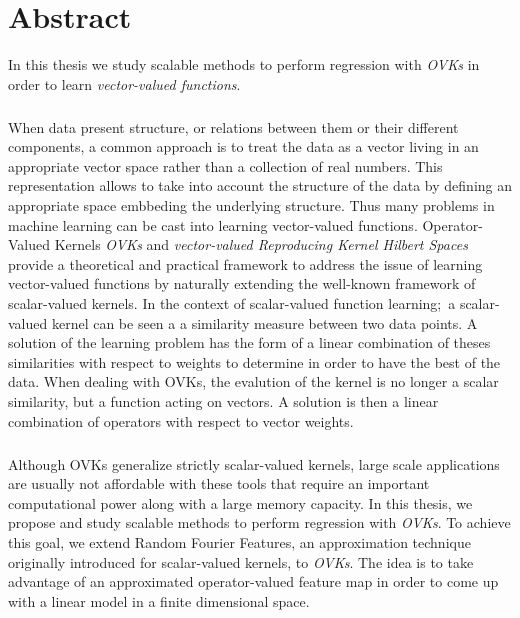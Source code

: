 



\begingroup
\let\clearpage\relax
\let\cleardoublepage\relax
\let\cleardoublepage\relax

\chapter*{Abstract}
In this thesis we study scalable methods to perform regression with
\emph{\acl{OVK}s} in order to learn \emph{vector-valued functions}.
\paragraph{}
When data present structure, or relations between them or their different
components, a common approach is to treat the data as a vector living in an
appropriate vector space rather than a collection of real numbers. This
representation allows to take into account the structure of the data by
defining an appropriate space embbeding the underlying structure. Thus many
problems in machine learning can be cast into learning vector-valued functions.
Operator-Valued Kernels \emph{\acl{OVK}s} and \emph{vector-valued Reproducing
Kernel Hilbert Spaces} provide a theoretical and practical framework to address
the issue of learning vector-valued functions by naturally extending the
well-known framework of scalar-valued kernels. In the context of scalar-valued
function learning;~a scalar-valued kernel can be seen a a similarity measure
between two data points. A solution of the learning problem has the form of a
linear combination of theses similarities with respect to weights to determine
in order to have the best  of the data. When dealing with \acl{OVK}s,
the evalution of the kernel is no longer a scalar similarity, but a function
acting on vectors. A solution is then a linear combination of operators with
respect to vector weights.
\paragraph{} 
Although \acl{OVK}s generalize strictly scalar-valued kernels,
large scale applications are usually not affordable with these tools that
require an important computational power along with a large memory capacity. In
this thesis, we propose and study scalable methods to perform regression with
\emph{\acl{OVK}s}. To achieve this goal, we extend Random Fourier Features, an
approximation technique originally introduced for scalar-valued kernels, to
\emph{\acl{OVK}s}. The idea is to take advantage of an approximated
operator-valued feature map in order to come up with a linear model in a finite
dimensional space.
